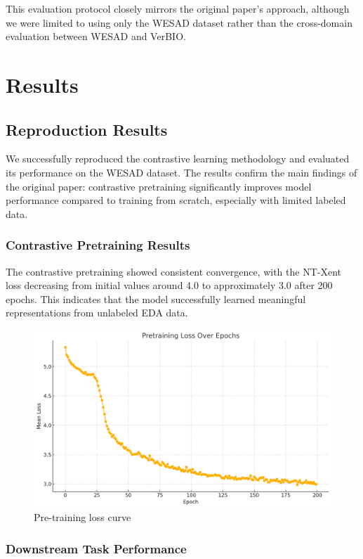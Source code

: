 \documentclass[10pt,letterpaper,twocolumn]{article}
\begin{document}
This evaluation protocol closely mirrors the original paper's approach, although we were limited to using only the WESAD dataset rather than the cross-domain evaluation between WESAD and VerBIO.

\section{Results}

\subsection{Reproduction Results}

We successfully reproduced the contrastive learning methodology and evaluated its performance on the WESAD dataset. The results confirm the main findings of the original paper: contrastive pretraining significantly improves model performance compared to training from scratch, especially with limited labeled data.

\subsubsection{Contrastive Pretraining Results}

The contrastive pretraining showed consistent convergence, with the NT-Xent loss decreasing from initial values around 4.0 to approximately 3.0 after 200 epochs. This indicates that the model successfully learned meaningful representations from unlabeled EDA data.

\begin{figure}[ht]
\centering
\includegraphics[width=0.9\columnwidth]{pretraining.png}
\caption{Pre-training loss curve}
\label{fig:pretraining}
\end{figure}

\subsubsection{Downstream Task Performance}
\end{document}
